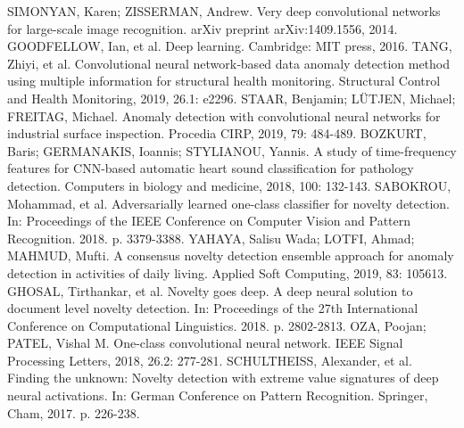 \documentclass[11pt,twoside,openright]{report}
\begin{document}
\begin{thebibliography}{L}
SIMONYAN, Karen; ZISSERMAN, Andrew. Very deep convolutional networks for large-scale image recognition. arXiv preprint arXiv:1409.1556, 2014.
GOODFELLOW, Ian, et al. Deep learning. Cambridge: MIT press, 2016.
TANG, Zhiyi, et al. Convolutional neural network‐based data anomaly detection method using multiple information for structural health monitoring. Structural Control and Health Monitoring, 2019, 26.1: e2296.
STAAR, Benjamin; LÜTJEN, Michael; FREITAG, Michael. Anomaly detection with convolutional neural networks for industrial surface inspection. Procedia CIRP, 2019, 79: 484-489.
BOZKURT, Baris; GERMANAKIS, Ioannis; STYLIANOU, Yannis. A study of time-frequency features for CNN-based automatic heart sound classification for pathology detection. Computers in biology and medicine, 2018, 100: 132-143.
SABOKROU, Mohammad, et al. Adversarially learned one-class classifier for novelty detection. In: Proceedings of the IEEE Conference on Computer Vision and Pattern Recognition. 2018. p. 3379-3388.
YAHAYA, Salisu Wada; LOTFI, Ahmad; MAHMUD, Mufti. A consensus novelty detection ensemble approach for anomaly detection in activities of daily living. Applied Soft Computing, 2019, 83: 105613.
GHOSAL, Tirthankar, et al. Novelty goes deep. A deep neural solution to document level novelty detection. In: Proceedings of the 27th International Conference on Computational Linguistics. 2018. p. 2802-2813.
OZA, Poojan; PATEL, Vishal M. One-class convolutional neural network. IEEE Signal Processing Letters, 2018, 26.2: 277-281.
SCHULTHEISS, Alexander, et al. Finding the unknown: Novelty detection with extreme value signatures of deep neural activations. In: German Conference on Pattern Recognition. Springer, Cham, 2017. p. 226-238.


\end{thebibliography}
\end{document}
